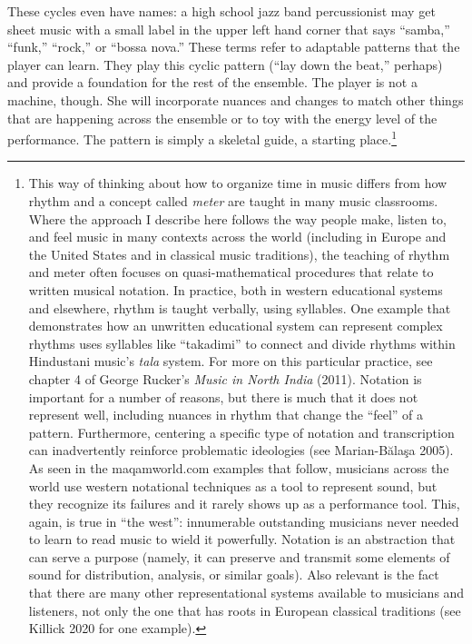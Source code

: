 \documentclass[twoside]{article}
\begin{document}
These cycles even have names: a high school jazz band percussionist may
get sheet music with a small label in the upper left hand corner that
says ``samba,'' ``funk,'' ``rock,'' or ``bossa nova.'' These terms refer
to adaptable patterns that the player can learn. They play this cyclic
pattern (``lay down the beat,'' perhaps) and provide a foundation for
the rest of the ensemble. The player is not a machine, though. She will
incorporate nuances and changes to match other things that are happening
across the ensemble or to toy with the energy level of the performance.
The pattern is simply a skeletal guide, a starting place.\footnote{This
  way of thinking about how to organize time in music differs from how
  rhythm and a concept called \emph{meter} are taught in many music
  classrooms. Where the approach I describe here follows the way people
  make, listen to, and feel music in many contexts across the world
  (including in Europe and the United States and in classical music
  traditions), the teaching of rhythm and meter often focuses on
  quasi-mathematical procedures that relate to written musical notation.
  In practice, both in western educational systems and elsewhere, rhythm
  is taught verbally, using syllables. One example that demonstrates how
  an unwritten educational system can represent complex rhythms uses
  syllables like ``takadimi'' to connect and divide rhythms within
  Hindustani music's \emph{tala} system. For more on this particular
  practice, see chapter 4 of George Rucker's \emph{Music in North India}
  (2011). Notation is important for a number of reasons, but there is
  much that it does not represent well, including nuances in rhythm that
  change the ``feel'' of a pattern. Furthermore, centering a specific
  type of notation and transcription can inadvertently reinforce
  problematic ideologies (see Marian-Bălaşa 2005). As seen in the
  maqamworld.com examples that follow, musicians across the world use
  western notational techniques as a tool to represent sound, but they
  recognize its failures and it rarely shows up as a performance tool.
  This, again, is true in ``the west'': innumerable outstanding
  musicians never needed to learn to read music to wield it powerfully.
  Notation is an abstraction that can serve a purpose (namely, it can
  preserve and transmit some elements of sound for distribution,
  analysis, or similar goals). Also relevant is the fact that there are
  many other representational systems available to musicians and
  listeners, not only the one that has roots in European classical
  traditions (see Killick 2020 for one example).}
\end{document}
